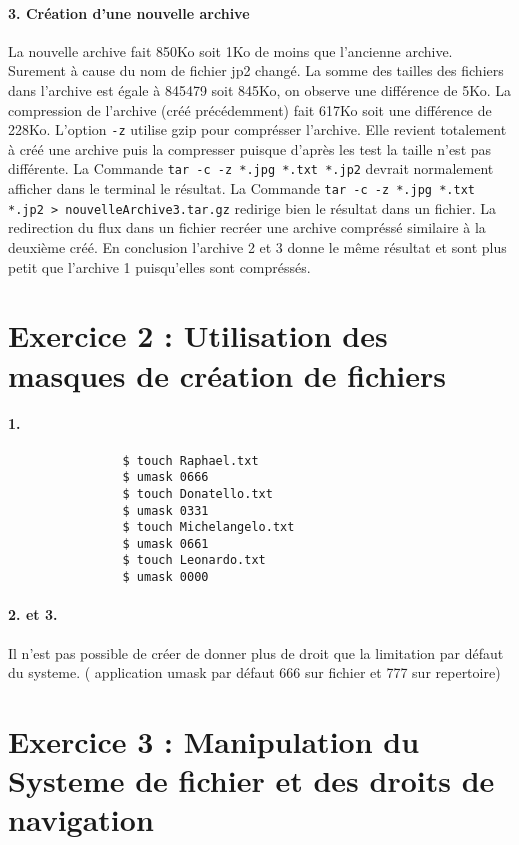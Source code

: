         \paragraph{3. Création d'une nouvelle archive}
            La nouvelle archive fait 850Ko soit 1Ko de moins que l'ancienne archive. Surement à cause du nom de fichier jp2 changé.
            La somme des tailles des fichiers dans l'archive est égale à 845479 soit 845Ko, on observe une différence de 5Ko.
            La compression de l'archive (créé précédemment) fait 617Ko soit une différence de 228Ko.
            L'option \texttt{-z} utilise gzip pour comprésser l'archive.
            Elle revient totalement à créé une archive puis la compresser puisque d'après les test la taille n'est pas différente.
            La Commande \texttt{tar -c -z *.jpg *.txt *.jp2} devrait normalement afficher dans le terminal le résultat.
            La Commande \texttt{tar -c -z *.jpg *.txt *.jp2 > nouvelleArchive3.tar.gz} redirige bien le résultat dans un fichier.
            La redirection du flux dans un fichier recréer une archive compréssé similaire à la deuxième créé.
            En conclusion l'archive 2 et 3 donne le même résultat et sont plus petit que l'archive 1 puisqu'elles sont compréssés.
    \section{Exercice 2 : Utilisation des masques de création de fichiers}
        \paragraph{1.}
            \begin{lstlisting}
                $ touch Raphael.txt
                $ umask 0666
                $ touch Donatello.txt
                $ umask 0331
                $ touch Michelangelo.txt
                $ umask 0661
                $ touch Leonardo.txt
                $ umask 0000
            \end{lstlisting}
        \paragraph{2. et 3.}
            Il n'est pas possible de créer de donner plus de droit que la limitation par défaut du systeme.
            ( application umask par défaut 666 sur fichier et 777 sur repertoire)
    \section{Exercice 3 : Manipulation du Systeme de fichier et des droits de navigation}
